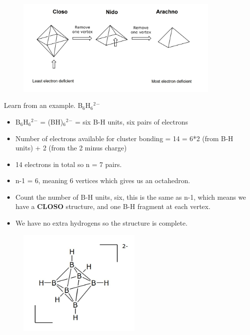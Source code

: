 \documentclass{article}
\renewcommand{\sup}[1]{\(^#1\)}
\newcommand{\sub}[1]{\(_#1\)}
\begin{document}
    \begin{figure}[h]
        \centering
        \includegraphics[width=10cm]{closo.jpg}
    \end{figure}

    Learn from an example. B\sub{6}H\sub{6}\sup{2}\sup{-}
    
    \begin{itemize}
        \item B\sub{6}H\sub{6}\sup{2}\sup{-} = (BH)\sub{6}\sup{2}\sup{-} = six B-H units, six pairs of electrons
        \item Number of electrons available for cluster bonding = 14 = 6*2 (from B-H units) + 2 (from the 2 minus charge)
        \item 14 electrons in total so n = 7 pairs.
        \item n-1 = 6, meaning 6 vertices which gives us an octahedron.
        \item Count the number of B-H units, six, this is the same as n-1, which means we have a \textbf{CLOSO} structure, and one B-H fragment at each vertex.
        \item We have no extra hydrogens so the structure is complete.
    \end{itemize}

    \begin{figure}[h]
        \centering
        \includegraphics[width=6cm]{boro.jpg}
    \end{figure}

    \newpage
\end{document}
